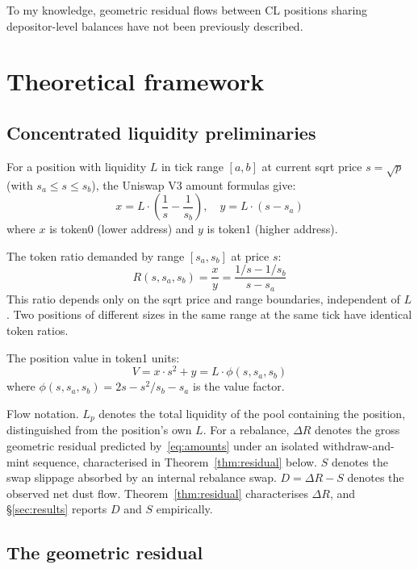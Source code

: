 \documentclass[11pt,a4paper]{article}
\begin{document}
To my knowledge, geometric residual flows between CL positions sharing depositor-level balances have not been previously described.

\section{Theoretical framework}\label{sec:theory}

\subsection{Concentrated liquidity preliminaries}\label{sec:preliminaries}

For a position with liquidity $L$ in tick range $[a, b]$ at current sqrt price $s = \sqrt{p}$ (with $s_a \leq s \leq s_b$), the Uniswap V3 amount formulas give:
\begin{equation}\label{eq:amounts}
x = L \cdot \left(\frac{1}{s} - \frac{1}{s_b}\right), \quad y = L \cdot (s - s_a)
\end{equation}
where $x$ is token0 (lower address) and $y$ is token1 (higher address).

The token ratio demanded by range $[s_a, s_b]$ at price $s$:
\begin{equation}\label{eq:ratio}
R(s, s_a, s_b) = \frac{x}{y} = \frac{1/s - 1/s_b}{s - s_a}
\end{equation}
This ratio depends only on the sqrt price and range boundaries, independent of $L$. Two positions of different sizes in the same range at the same tick have identical token ratios.

The position value in token1 units:
\begin{equation}\label{eq:value}
V = x \cdot s^2 + y = L \cdot \phi(s, s_a, s_b)
\end{equation}
where $\phi(s, s_a, s_b) = 2s - s^2/s_b - s_a$ is the value factor.

Flow notation. $L_p$ denotes the total liquidity of the pool containing the position, distinguished from the position's own $L$. For a rebalance, $\Delta R$ denotes the gross geometric residual predicted by~\eqref{eq:amounts} under an isolated withdraw-and-mint sequence, characterised in Theorem~\ref{thm:residual} below. $S$ denotes the swap slippage absorbed by an internal rebalance swap. $D = \Delta R - S$ denotes the observed net dust flow. Theorem~\ref{thm:residual} characterises $\Delta R$, and \S\ref{sec:results} reports $D$ and $S$ empirically.

\subsection{The geometric residual}\label{sec:residual}
\end{document}
